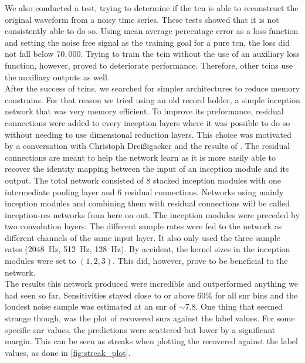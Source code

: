 We also conducted a test, trying to determine if the \gls{tcn} is able to reconstruct the original waveform from a noisy time series. These tests showed that it is not consistently able to do so. Using mean average percentage error as a loss function and setting the noise free signal as the training goal for a pure \gls{tcn}, the loss did not fall below $70,000$. Trying to train the \gls{tcin} without the use of an auxiliary loss function, however, proved to deteriorate performance.
 Therefore, other \gls{tcin}s use the auxiliary outputs as well.\medskip\\
After the success of \gls{tcin}s, we searched for simpler architectures to reduce memory constrains. For that reason we tried using an old record holder, a simple inception network that was very memory efficient. To improve its preformance, residual connections were added to every inception layers where it was possible to do so without needing to use dimensional reduction layers. This choice was motivated by a conversation with Christoph Dreißigacker and the results of \cite{residual_connections_invention}. The residual connections are meant to help the network learn as it is more easily able to recover the identity mapping between the input of an inception module and its output.
 The total network consisted of 8 stacked inception modules with one intermediate pooling layer and 6 residual connections. Networks using mainly inception modules and combining them with residual connections will be called inception-res networks from here on out. The inception modules were preceded by two convolution layers. The different sample rates were fed to the network as different channels of the same input layer. It also only used the three sample rates (\SI{2048}{\hertz}, \SI{512}{\hertz}, \SI{128}{\hertz}). By accident, the kernel sizes in the inception modules were set to $(1,2,3)$. This did, however, prove to be beneficial to the network.\\
The results this network produced were incredible and outperformed anything we had seen so far. Sensitivities stayed close to or above 60\% for all \gls{snr} bins and the loudest noise sample was estimated at an \gls{snr} of $\sim 7.8$. One thing that seemed strange though, was the plot of recovered \gls{snr}s against the label values. For some specific \gls{snr} values, the predictions were scattered but lower by a significant margin. This can be seen as streaks when plotting the recovered against the label values, as done in \autoref{fig:streak_plot}.\smallskip\\
